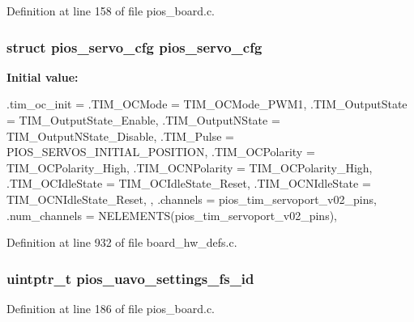 \-Definition at line 158 of file pios\-\_\-board.\-c.

\hypertarget{group___sparky_ga57a87ef16d7949a9cc3589efc8d88a28}{
\subsubsection[{pios\-\_\-servo\-\_\-cfg}]{\setlength{\rightskip}{0pt plus 5cm}struct {\bf pios\-\_\-servo\-\_\-cfg} {\bf pios\-\_\-servo\-\_\-cfg}}}\label{group___sparky_ga57a87ef16d7949a9cc3589efc8d88a28}
{\bfseries \-Initial value\-:}
\begin{DoxyCode}
 {
        .tim_oc_init = {
                .TIM_OCMode = TIM_OCMode_PWM1,
                .TIM_OutputState = TIM_OutputState_Enable,
                .TIM_OutputNState = TIM_OutputNState_Disable,
                .TIM_Pulse = PIOS_SERVOS_INITIAL_POSITION,
                .TIM_OCPolarity = TIM_OCPolarity_High,
                .TIM_OCNPolarity = TIM_OCPolarity_High,
                .TIM_OCIdleState = TIM_OCIdleState_Reset,
                .TIM_OCNIdleState = TIM_OCNIdleState_Reset,
        },
        .channels = pios_tim_servoport_v02_pins,
        .num_channels = NELEMENTS(pios_tim_servoport_v02_pins),
}
\end{DoxyCode}


\-Definition at line 932 of file board\-\_\-hw\-\_\-defs.\-c.

\hypertarget{group___sparky_gab060f441dd600b08386c0ca1b487217a}{
\subsubsection[{pios\-\_\-uavo\-\_\-settings\-\_\-fs\-\_\-id}]{\setlength{\rightskip}{0pt plus 5cm}uintptr\-\_\-t {\bf pios\-\_\-uavo\-\_\-settings\-\_\-fs\-\_\-id}}}\label{group___sparky_gab060f441dd600b08386c0ca1b487217a}


\-Definition at line 186 of file pios\-\_\-board.\-c.

